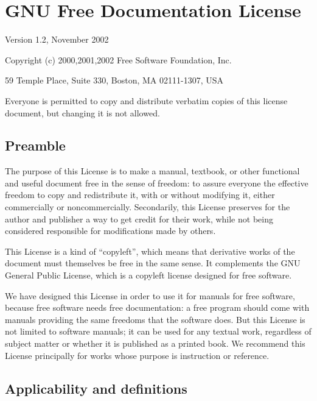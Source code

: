 %

\section{GNU Free Documentation License\label{sec:GFDL} }

Version 1.2, November 2002

Copyright (c) 2000,2001,2002 Free Software Foundation, Inc. 

59 Temple Place, Suite 330, Boston, MA 02111-1307, USA

Everyone is permitted to copy and distribute verbatim copies of this
license document, but changing it is not allowed.



\subsection{Preamble}

The purpose of this License is to make a manual, textbook, or other
functional and useful document free in the sense of freedom: to assure
everyone the effective freedom to copy and redistribute it, with or
without modifying it, either commercially or noncommercially. Secondarily,
this License preserves for the author and publisher a way to get credit
for their work, while not being considered responsible for modifications
made by others.

This License is a kind of ``copyleft'', which means that derivative
works of the document must themselves be free in the same sense. It
complements the GNU General Public License, which is a copyleft license
designed for free software.

We have designed this License in order to use it for manuals for free
software, because free software needs free documentation: a free program
should come with manuals providing the same freedoms that the software
does. But this License is not limited to software manuals; it can
be used for any textual work, regardless of subject matter or whether
it is published as a printed book. We recommend this License principally
for works whose purpose is instruction or reference.


\subsection{Applicability and definitions\label{sub:1Applicability-and-definitions}}

